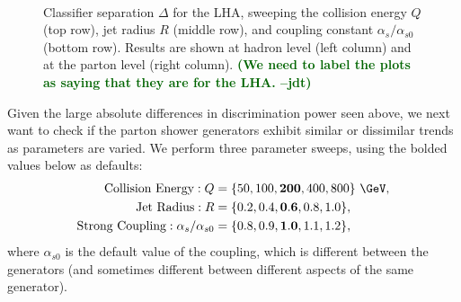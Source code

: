 \documentclass[11pt]{cernrep}
\newcommand{\jdt}[1]{\textbf{\textcolor{darkgreen}{(#1 --jdt)}}}
\begin{document}
\begin{figure}
$\qquad$
\caption{Classifier separation $\Delta$ for the LHA, sweeping the collision energy $Q$ (top row), jet radius $R$ (middle row), and coupling constant $\alpha_s/\alpha_{s0}$ (bottom row).  Results are shown at hadron level (left column) and at the parton level (right column).  \jdt{We need to label the plots as saying that they are for the LHA.}}
\label{quarkgluon_fig:ee_sweep}
\end{figure}

Given the large absolute differences in discrimination power seen above, we next want to check if the parton shower generators exhibit similar or dissimilar trends as parameters are varied.  We perform three parameter sweeps, using the bolded values below as defaults:
\begin{equation}
\begin{aligned}
\text{Collision Energy}: Q &= \{ 50, 100, \mathbf{200}, 400, 800\}~\GeV, \\
\text{Jet Radius}: R &= \{ 0.2, 0.4, \mathbf{0.6}, 0.8, 1.0\}, \\
\text{Strong Coupling}: \alpha_s / \alpha_{s0} &= \{0.8,0.9,\mathbf{1.0},1.1,1.2\}, \\
\end{aligned}
\end{equation}
where $\alpha_{s0}$ is the default value of the coupling, which is different between the generators (and sometimes different between different aspects of the same generator).
\end{document}
